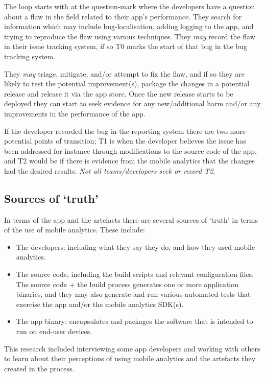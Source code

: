 The loop starts with at the question-mark where the developers have a question about a flaw in the field related to their app's performance. They search for information which may include bug-localisation, adding logging to the app, and trying to reproduce the flaw using various techniques. They \emph{may} record the flaw in their issue tracking system, if so T0 marks the start of that bug in the bug tracking system.

They \emph{may} triage, mitigate, and/or attempt to fix the flaw, and if so they are likely to test the potential improvement(s), package the changes in a potential release and release it via the app store. Once the new release starts to be deployed they can start to seek evidence for any new/additional harm and/or any improvements in the performance of the app.

If the developer recorded the bug in the reporting system there are two more potential points of transition; T1 is when the developer believes the issue has been addressed for instance through modifications to the source code of the app, and T2 would be if there is evidence from the mobile analytics that the changes had the desired results. \emph{Not all teams/developers seek or record T2}.


\subsection{Sources of `truth'}
In terms of the app and the artefacts there are several sources of `truth' in terms of the use of mobile analytics. These include:
\begin{itemize}
    \itemsep0em
    \item The developers: including what they say they do, and how they used mobile analytics.
    \item The source code, including the build scripts and relevant configuration files. The source code + the build process generates one or more application binaries, and they may also generate and run various automated tests that exercise the app and/or the mobile analytics SDK(s).
    \item The app binary: encapsulates and packages the software that is intended to run on end-user devices. 
\end{itemize}

This research included interviewing some app developers and working with others to learn about their perceptions of using mobile analytics and the artefacts they created in the process.

